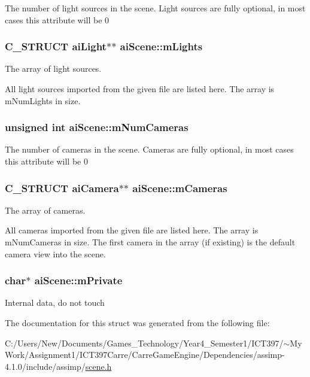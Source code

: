The number of light sources in the scene. Light sources are fully optional, in most cases this attribute will be 0 \hypertarget{structai_scene_2e64a69ade81cae0b3901bea90b6bb47}{
\subsubsection[mLights]{\setlength{\rightskip}{0pt plus 5cm}C\_\-STRUCT {\bf aiLight}$\ast$$\ast$ {\bf aiScene::mLights}}}
\label{structai_scene_2e64a69ade81cae0b3901bea90b6bb47}


The array of light sources.

All light sources imported from the given file are listed here. The array is mNumLights in size. \hypertarget{structai_scene_4abc432e1b22a7e01553f33c79c0592f}{
\subsubsection[mNumCameras]{\setlength{\rightskip}{0pt plus 5cm}unsigned int {\bf aiScene::mNumCameras}}}
\label{structai_scene_4abc432e1b22a7e01553f33c79c0592f}


The number of cameras in the scene. Cameras are fully optional, in most cases this attribute will be 0 \hypertarget{structai_scene_71e7d204d96969ca4f5a931f4d636f1e}{
\subsubsection[mCameras]{\setlength{\rightskip}{0pt plus 5cm}C\_\-STRUCT {\bf aiCamera}$\ast$$\ast$ {\bf aiScene::mCameras}}}
\label{structai_scene_71e7d204d96969ca4f5a931f4d636f1e}


The array of cameras.

All cameras imported from the given file are listed here. The array is mNumCameras in size. The first camera in the array (if existing) is the default camera view into the scene. \hypertarget{structai_scene_dc5fcf5c4ef86a45f721560d6c1a4923}{
\subsubsection[mPrivate]{\setlength{\rightskip}{0pt plus 5cm}char$\ast$ {\bf aiScene::mPrivate}}}
\label{structai_scene_dc5fcf5c4ef86a45f721560d6c1a4923}


Internal data, do not touch 

The documentation for this struct was generated from the following file:\begin{CompactItemize}
\item 
C:/Users/New/Documents/Games\_\-Technology/Year4\_\-Semester1/ICT397/$\sim$My Work/Assignment1/ICT397Carre/CarreGameEngine/Dependencies/assimp-4.1.0/include/assimp/\hyperlink{scene_8h}{scene.h}\end{CompactItemize}

